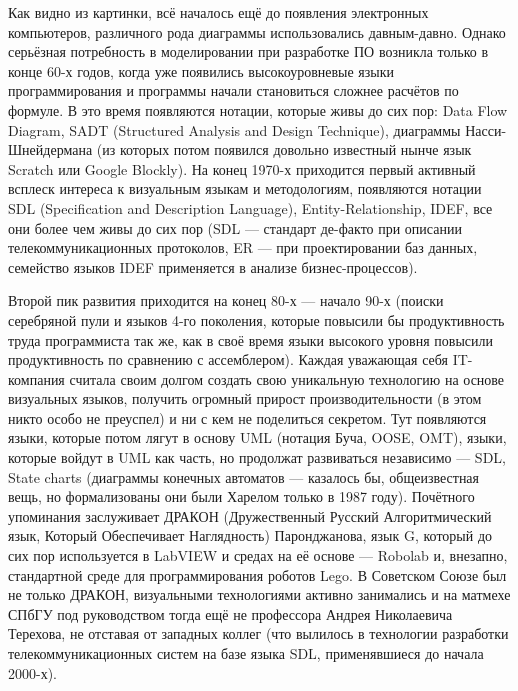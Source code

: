 \documentclass{../../text-style}
\begin{document}
Как видно из картинки, всё началось ещё до появления электронных компьютеров, различного рода диаграммы использовались давным-давно. Однако серьёзная потребность в моделировании при разработке ПО возникла только в конце 60-х годов, когда уже появились высокоуровневые языки программирования и программы начали становиться сложнее расчётов по формуле. В это время появляются нотации, которые живы до сих пор: Data Flow Diagram, SADT (Structured Analysis and Design Technique), диаграммы Насси-Шнейдермана (из которых потом появился довольно известный нынче язык Scratch или Google Blockly). На конец 1970-х приходится первый активный всплеск интереса к визуальным языкам и методологиям, появляются нотации SDL (Specification and Description Language), Entity-Relationship, IDEF, все они более чем живы до сих пор (SDL --- стандарт де-факто при описании телекоммуникационных протоколов, ER --- при проектировании баз данных, семейство языков IDEF применяется в анализе бизнес-процессов). 

Второй пик развития приходится на конец 80-х --- начало 90-х (поиски серебряной пули и языков 4-го поколения, которые повысили бы продуктивность труда программиста так же, как в своё время языки высокого уровня повысили продуктивность по сравнению с ассемблером). Каждая уважающая себя IT-компания считала своим долгом создать свою уникальную технологию на основе визуальных языков, получить огромный прирост производительности (в этом никто особо не преуспел) и ни с кем не поделиться секретом. Тут появляются языки, которые потом лягут в основу UML (нотация Буча, OOSE, OMT), языки, которые войдут в UML как часть, но продолжат развиваться независимо --- SDL, State charts (диаграммы конечных автоматов --- казалось бы, общеизвестная вещь, но формализованы они были Харелом только в 1987 году). Почётного упоминания заслуживает ДРАКОН (Дружественный Русский Алгоритмический язык, Который Обеспечивает Наглядность) Паронджанова, язык G, который до сих пор используется в LabVIEW и средах на её основе --- Robolab и, внезапно, стандартной среде для программирования роботов Lego. В Советском Союзе был не только ДРАКОН, визуальными технологиями активно занимались и на матмехе СПбГУ под руководством тогда ещё не профессора Андрея Николаевича Терехова, не отставая от западных коллег (что вылилось в технологии разработки телекоммуникационных систем на базе языка SDL, применявшиеся до начала 2000-х).
\end{document}
